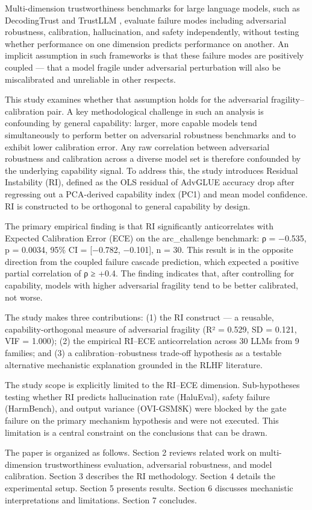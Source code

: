 
Multi-dimension trustworthiness benchmarks for large language models, such as DecodingTrust \citep{Wangetal2023} and TrustLLM \citep{Sunetal2024}, evaluate failure modes including adversarial robustness, calibration, hallucination, and safety independently, without testing whether performance on one dimension predicts performance on another. An implicit assumption in such frameworks is that these failure modes are positively coupled — that a model fragile under adversarial perturbation will also be miscalibrated and unreliable in other respects.

This study examines whether that assumption holds for the adversarial fragility–calibration pair. A key methodological challenge in such an analysis is confounding by general capability: larger, more capable models tend simultaneously to perform better on adversarial robustness benchmarks and to exhibit lower calibration error. Any raw correlation between adversarial robustness and calibration across a diverse model set is therefore confounded by the underlying capability signal. To address this, the study introduces Residual Instability (RI), defined as the OLS residual of AdvGLUE accuracy drop after regressing out a PCA-derived capability index (PC1) and mean model confidence. RI is constructed to be orthogonal to general capability by design.

The primary empirical finding is that RI significantly anticorrelates with Expected Calibration Error (ECE) on the arc_challenge benchmark: ρ = −0.535, p = 0.0034, 95\% CI = [−0.782, −0.101], n = 30. This result is in the opposite direction from the coupled failure cascade prediction, which expected a positive partial correlation of ρ ≥ +0.4. The finding indicates that, after controlling for capability, models with higher adversarial fragility tend to be better calibrated, not worse.

The study makes three contributions: (1) the RI construct — a reusable, capability-orthogonal measure of adversarial fragility (R² = 0.529, SD = 0.121, VIF = 1.000); (2) the empirical RI–ECE anticorrelation across 30 LLMs from 9 families; and (3) a calibration–robustness trade-off hypothesis as a testable alternative mechanistic explanation grounded in the RLHF literature.

The study scope is explicitly limited to the RI–ECE dimension. Sub-hypotheses testing whether RI predicts hallucination rate (HaluEval), safety failure (HarmBench), and output variance (OVI-GSM8K) were blocked by the gate failure on the primary mechanism hypothesis and were not executed. This limitation is a central constraint on the conclusions that can be drawn.

The paper is organized as follows. Section 2 reviews related work on multi-dimension trustworthiness evaluation, adversarial robustness, and model calibration. Section 3 describes the RI methodology. Section 4 details the experimental setup. Section 5 presents results. Section 6 discusses mechanistic interpretations and limitations. Section 7 concludes.

